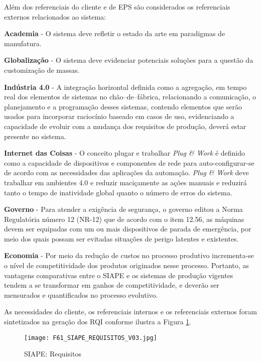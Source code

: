 Além dos referenciais do cliente e de EPS são considerados os referenciais externos relacionados ao sistema:	 \par 
\textbf{Academia} - O sistema deve refletir o estado da arte em paradigmas de manufatura.\par 
\textbf{Globalização} -  O sistema deve evidenciar potenciais soluções para a questão da customização de massas.\par 
\textbf{Indústria 4.0} - A integração horizontal definida como a agregação, em tempo real dos elementos de sistemas no chão--de--fábrica, relacionando a comunicação, o planejamento e a programação desses sistemas, contendo elementos que serão usados para incorporar raciocínio baseado em casos de uso, evidenciando a capacidade de evoluir com a mudança dos requisitos de produção, deverá estar presente no sistema.\par 
\textbf{Internet das Coisas} -  O conceito plugar e trabalhar \textit{ Plug \& Work}  é definido como a capacidade de dispositivos e componentes de rede para auto-configurar-se de acordo com as necessidades das aplicações da automação. \textit{Plug \& Work} deve trabalhar em ambientes 4.0 e reduzir maciçamente as ações manuais e reduzirá tanto o tempo de inatividade global quanto o número de erros do sistema.\par 
\textbf{Governo} -  Para atender a exigência de segurança, o governo editou a Norma Regulatória número 12 (NR-12) que de acordo com o item 12.56, as máquinas devem ser equipadas com um ou mais dispositivos de parada de emergência, por meio dos quais possam ser evitadas situações de perigo latentes e existentes.\par 
\textbf{Economia} -  Por meio da redução de custos no processo produtivo incrementa-se o nível de competitividade dos produtos originados nesse processo. Portanto, as vantagens comparativas entre o SIAPE e os sistemas de produção vigentes tendem a se transformar em ganhos de competitividade, e deverão ser mensurados e quantificados no processo evolutivo. \par 
As necessidades do cliente, os referenciais internos e os referenciais externos foram sintetizados na geração dos RQI conforme ilustra a Figura \ref{F61}. 

\begin{landscape}
	\begin{figure}[!h]
		\centering
		\texttt{[image: F61\_SIAPE\_REQUISITOS\_V03.jpg]} 
		\caption{SIAPE: Requisitos}
		\label{F61}
	\end{figure}
\end{landscape}


